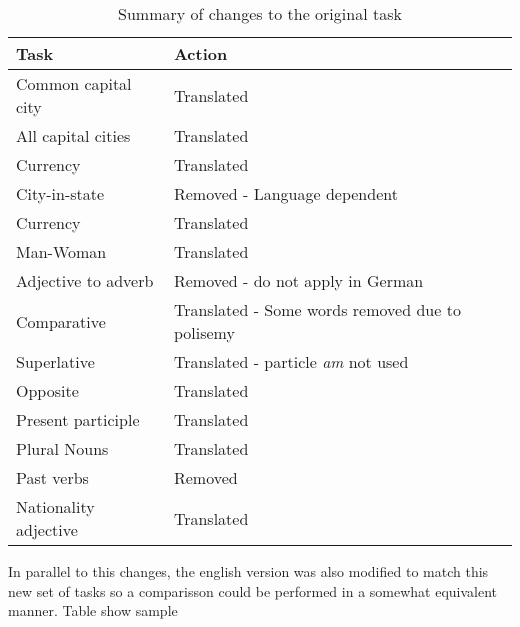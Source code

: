  \begin{table}[h]
   \centering
   \caption{Summary of changes to the original task } 
   \label{tab:summary_of_changes_task}

   \begin{tabular}{ |l|l|  }

   \hline           
   Task  & Action   \\  \hline           
   Common capital city & Translated \\
   All capital cities  & Translated \\
   Currency & Translated  \\ 
   City-in-state   &  Removed - Language dependent \\
   Currency & Translated  \\
   Man-Woman  & Translated  \\
   Adjective to adverb  &  Removed - do not apply in German \\
   Comparative & Translated - Some words removed due to polisemy \\ 
   Superlative & Translated - particle \textit{am} not used \\
   Opposite  & Translated \\
   Present participle & Translated \\
   Plural Nouns  & Translated \\
   Past verbs &  Removed \\

   Nationality adjective & Translated \\
   
\hline

  
\end{tabular}
\end{table}
    
In parallel to this changes, the english version was also modified to match
this new set of tasks so a comparisson could be performed in a somewhat
equivalent manner.  Table show sample 


